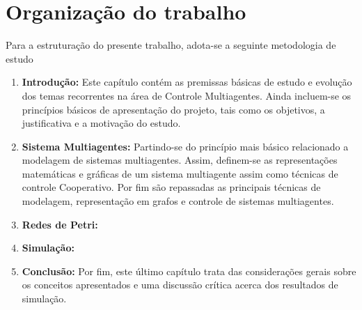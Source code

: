 \section{Organização do trabalho}
Para a estruturação do presente trabalho, adota-se a seguinte metodologia de estudo

\begin{enumerate}
\item 
\textbf{Introdução:} Este capítulo contém as premissas básicas de estudo e evolução dos temas recorrentes na área de Controle Multiagentes. Ainda incluem-se os princípios básicos de apresentação do projeto, tais como os objetivos, a justificativa e a motivação do estudo.

\item \textbf{Sistema Multiagentes: } Partindo-se do princípio mais básico relacionado a modelagem de sistemas multiagentes. Assim, definem-se as representações matemáticas e gráficas de um sistema multiagente assim como técnicas de controle Cooperativo. Por fim são repassadas as principais técnicas de modelagem, representação em grafos e controle de sistemas multiagentes. 
    
\item \textbf{Redes de Petri: } 
    
\item \textbf{Simulação:} 
    
\item \textbf{Conclusão:} Por fim, este último capítulo trata das considerações gerais sobre os conceitos apresentados e uma discussão crítica acerca dos resultados de simulação.

\end{enumerate}

	
